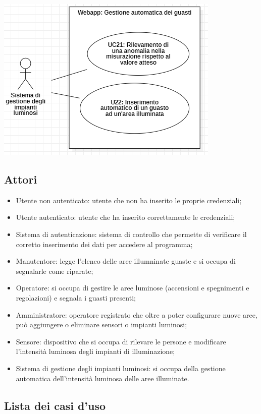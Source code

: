 \documentclass[a4paper, 12pt]{article}
\begin{document}
\includegraphics[scale=0.65]{diagramma_use_case_12.png}

\subsection{Attori}
\begin{itemize}
    \item Utente non autenticato: utente che non ha inserito le proprie credenziali;
    \item Utente autenticato: utente che ha inserito correttamente le credenziali;
    \item Sistema di autenticazione: sistema di controllo che permette di verificare il corretto inserimento dei dati per accedere al programma;
    \item Manutentore: legge l'elenco delle aree illumninate guaste e si occupa di segnalarle come riparate;
    \item Operatore: si occupa di gestire le aree luminose (accensioni e spegnimenti e regolazioni) e segnala i guasti presenti;
    \item Amministratore: operatore registrato che oltre a poter configurare nuove aree, può aggiungere o eliminare sensori o impianti luminosi;
    \item Sensore: dispositivo che si occupa di rilevare le persone e modificare l'intensità luminosa degli impianti di illuminazione;
    \item Sistema di gestione degli impianti luminosi: si occupa della gestione automatica dell'intensità luminosa delle aree illuminate.
\end{itemize}

\subsection{Lista dei casi d'uso}
\end{document}
